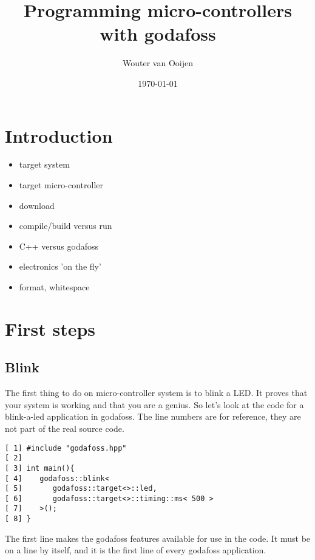 \documentclass{article}
\author{Wouter van Ooijen}
\title{Programming micro-controllers with godafoss}
\date{\today}
\begin{document}
\maketitle

\section{Introduction}

\begin{itemize}
\item  target system
\item  target micro-controller
\item  download
\item  compile/build versus run
\item  C++ versus godafoss
\item  electronics 'on the fly'
\item  format, whitespace
\end{itemize}

\section{First steps}

\subsection{Blink}

The first thing to do on micro-controller system is to blink a LED.
It proves that your system is working and that you are a genius.
So let's look at the code for a blink-a-led application in godafoss.
The line numbers are for reference, they are not part of the real
source code.

\lstset {language=C++}
\begin{lstlisting}
[ 1] #include "godafoss.hpp"
[ 2] 
[ 3] int main(){
[ 4]    godafoss::blink< 
[ 5]       godafoss::target<>::led, 
[ 6]       godafoss::target<>::timing::ms< 500 > 
[ 7]    >();
[ 8] }
\end{lstlisting}

The first line makes the godafoss features available for use in the code.
It must be on a line by itself, and it is the first line of every godafoss
application.
\end{document}
